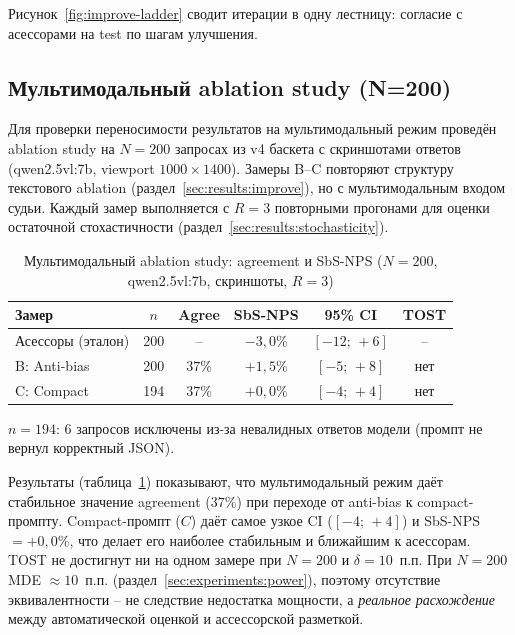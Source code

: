 Рисунок~\ref{fig:improve-ladder} сводит итерации в одну лестницу: согласие
с асессорами на test по шагам улучшения.

\subsection{Мультимодальный ablation study (N=200)}
\label{sec:results:multimodal-ablation}

Для проверки переносимости результатов на мультимодальный режим
проведён ablation study на $N=200$ запросах из v4 баскета с
скриншотами ответов (qwen2.5vl:7b, viewport $1000 \times 1400$).
Замеры B--C повторяют структуру текстового ablation
(раздел~\ref{sec:results:improve}), но с мультимодальным входом судьи.
Каждый замер выполняется с $R = 3$ повторными прогонами для оценки
остаточной стохастичности (раздел~\ref{sec:results:stochasticity}).

\begin{table}[htbp]
    \centering
    \caption{Мультимодальный ablation study: agreement и SbS-NPS
    ($N=200$, qwen2.5vl:7b, скриншоты, $R = 3$)}
    \label{tab:multimodal-ablation}
    \begin{tabular}{lccccc}
        \toprule
        Замер & $n$ & Agree & SbS-NPS & 95\% CI & TOST \\
        \midrule
        Асессоры (эталон) & 200 & -- & $-3{,}0\%$ & $[-12;\,{+}6]$ & -- \\
        B: Anti-bias & 200 & $37\%$ & $+1{,}5\%$ & $[-5;\,{+}8]$ & нет \\
        C: Compact & 194 & $37\%$ & $+0{,}0\%$ & $[-4;\,{+}4]$ & нет \\
        \bottomrule
    \end{tabular}
\end{table}

\noindent\footnotesize $n = 194$: 6 запросов исключены из-за невалидных ответов модели (промпт не вернул корректный JSON).\normalsize

Результаты (таблица~\ref{tab:multimodal-ablation}) показывают, что
мультимодальный режим даёт стабильное значение agreement ($37\%$) при переходе от anti-bias к compact-промпту. Compact-промпт ($C$) даёт самое узкое CI
($[-4;\,{+}4]$) и SbS-NPS $= +0{,}0\%$, что делает его наиболее
стабильным и ближайшим к асессорам. TOST не достигнут ни на одном
замере при $N = 200$ и $\delta = 10$~п.п. При $N = 200$
MDE $\approx 10$~п.п. (раздел~\ref{sec:experiments:power}), поэтому
отсутствие эквивалентности -- не следствие недостатка мощности, а
\emph{реальное расхождение} между автоматической оценкой и
ассессорской разметкой.


